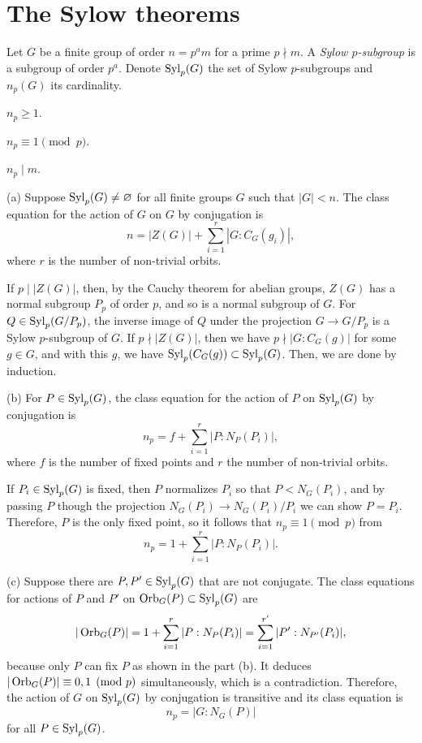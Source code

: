 \documentclass{../note}
\begin{document}
\section{The Sylow theorems}
\begin{prb}
Let $G$ be a finite group of order $n=p^am$ for a prime $p\nmid m$.
A \emph{Sylow $p$-subgroup} is a subgroup of order $p^a$.
Denote $\operatorname{Syl}_p(G)$ the set of Sylow $p$-subgroups and $n_p(G)$ its cardinality.
\begin{parts}
\item $n_p\ge1$.
\item $n_p\equiv1\pmod p$.
\item $n_p\mid m$.
\end{parts}
\end{prb}
\begin{pf}
(a)
Suppose $\operatorname{Syl}_p(G)\ne\varnothing$ for all finite groups $G$ such that $|G|<n$.
The class equation for the action of $G$ on $G$ by conjugation is
\[n=|Z(G)|+\sum_{i=1}^r|G:C_G(g_i)|,\]
where $r$ is the number of non-trivial orbits.

If $p\mid|Z(G)|$, then, by the Cauchy theorem for abelian groups, $Z(G)$ has a normal subgroup $P_p$ of order $p$, and so is a normal subgroup of $G$.
For $Q\in\operatorname{Syl}_p(G/P_p)$, the inverse image of $Q$ under the projection $G\to G/P_p$ is a Sylow $p$-subgroup of $G$.
If $p\nmid|Z(G)|$, then we have $p\nmid|G:C_G(g)|$ for some $g\in G$, and with this $g$, we have $\operatorname{Syl}_p(C_G(g))\subset\operatorname{Syl}_p(G)$.
Then, we are done by induction.

(b)
For $P\in\operatorname{Syl}_p(G)$, the class equation for the action of $P$ on $\operatorname{Syl}_p(G)$ by conjugation is
\[n_p=f+\sum_{i=1}^r|P:N_P(P_i)|,\]
where $f$ is the number of fixed points and $r$ the number of non-trivial orbits.

If $P_i\in\operatorname{Syl}_p(G)$ is fixed, then $P$ normalizes $P_i$ so that $P<N_G(P_i)$, and by passing $P$ though the projection $N_G(P_i)\to N_G(P_i)/P_i$ we can show $P=P_i$.
Therefore, $P$ is the only fixed point, so it follows that $n_p\equiv1\pmod p$ from
\[n_p=1+\sum_{i=1}^r|P:N_P(P_i)|.\]

(c)
Suppose there are $P,P'\in\operatorname{Syl}_p(G)$ that are not conjugate.
The class equations for actions of $P$ and $P'$ on $\operatorname{Orb}_G(P)\subset\operatorname{Syl}_p(G)$ are
\[|\operatorname{Orb}_G(P)|=1+\sum_{i=1}^r|P:N_P(P_i)|=\sum_{i=1}^{r'}|P':N_{P'}(P_i)|,\]
because only $P$ can fix $P$ as shown in the part (b).
It deduces $|\operatorname{Orb}_G(P)|\equiv0,1\pmod{p}$ simultaneously, which is a contradiction.
Therefore, the action of $G$ on $\operatorname{Syl}_p(G)$ by conjugation is transitive and its class equation is
\[n_p=|G:N_G(P)|\]
for all $P\in\operatorname{Syl}_p(G)$.
\end{pf}
\end{document}
